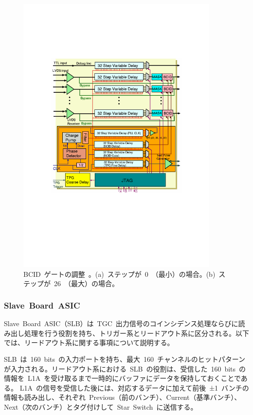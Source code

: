\begin{figure}[H]
\begin{minipage}{0.49\hsize}
        \centering
        \includegraphics[width=0.9\textwidth,page=4]{img/pdf/PP.pdf}
        \subcaption{}
        \end{minipage}
        \caption[BCID ゲートの調整]{BCID~ゲートの調整~\cite{URL:05}。(a)~ステップが~0~（最小）の場合。(b)~ステップが~26~（最大）の場合。}
        \label{fig:bcidgate}
\end{figure}

\subsubsection{Slave~Board~ASIC}
Slave~Board~ASIC（SLB）は~TGC~出力信号のコインシデンス処理ならびに読み出し処理を行う役割を持ち、トリガー系とリードアウト系に区分される。以下では、リードアウト系に関する事項について説明する。

SLB~は~160~bits~の入力ポートを持ち、最大~160~チャンネルのヒットパターンが入力される。リードアウト系における~SLB~の役割は、受信した~160~bits~の情報を~L1A~を受け取るまで一時的にバッファにデータを保持しておくことである。
L1A~の信号を受信した後には、対応するデータに加えて前後~±1~バンチの情報も読み出し、それぞれ~Previous（前のバンチ）、Current（基準バンチ）、Next（次のバンチ）とタグ付けして~Star~Switch~に送信する。

